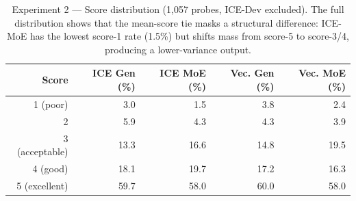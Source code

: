\documentclass[11pt,a4paper]{article}
\begin{document}
\begin{table}[htbp]
\centering
\small
\caption{Experiment 2 --- Per-conversation breakdown (generalist conditions). ICE wins more head-to-head comparisons on every conversation. On Dataset A (Creative Writing) ICE's win rate (37.2\%) is more than double the vector baseline's (18.0\%).}
\label{tab:exp2-perconv}
\end{table}

\begin{table}[htbp]
\centering
\small
\caption{Experiment 2 --- Score distribution (1,057 probes, ICE-Dev excluded). The full distribution shows that the mean-score tie masks a structural difference: ICE-MoE has the lowest score-1 rate (1.5\%) but shifts mass from score-5 to score-3/4, producing a lower-variance output.}
\label{tab:exp2-score-dist}
\begin{tabular}{rrrrr}
\toprule
\textbf{Score} & \textbf{ICE Gen (\%)} & \textbf{ICE MoE (\%)} & \textbf{Vec. Gen (\%)} & \textbf{Vec. MoE (\%)} \\
\midrule
1 (poor)      & 3.0 & 1.5 & 3.8 & 2.4 \\
2             & 5.9 & 4.3 & 4.3 & 3.9 \\
3 (acceptable)& 13.3 & 16.6 & 14.8 & 19.5 \\
4 (good)      & 18.1 & 19.7 & 17.2 & 16.3 \\
5 (excellent) & 59.7 & 58.0 & 60.0 & 58.0 \\
\bottomrule
\end{tabular}
\end{table}
\end{document}
